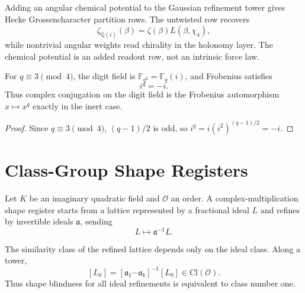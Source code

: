 \begin{principle}
\label{prin:innovation-input-modular-chirality-thermodynamics}
Adding an angular chemical potential to the Gaussian refinement tower gives
Hecke Grossencharacter partition rows. The untwisted row recovers
$$
\zeta_{\mathbb Q(i)}(\beta)=\zeta(\beta)L(\beta,\chi_4),
$$
while nontrivial angular weights read chirality in the holonomy layer. The
chemical potential is an added readout row, not an intrinsic force law.
\end{principle}

\begin{theorem}
\label{thm:innovation-input-modular-reflection-frobenius}
For $q\equiv 3\pmod{4}$, the digit field is
$\mathbb F_{q^2}=\mathbb F_q(i)$, and Frobenius satisfies
$$
i^q=-i.
$$
Thus complex conjugation on the digit field is the Frobenius automorphism
$x\mapsto x^q$ exactly in the inert case.
\end{theorem}

\begin{proof}
Since $q\equiv 3\pmod{4}$, $(q-1)/2$ is odd, so
$i^q=i(i^2)^{(q-1)/2}=-i$.
\end{proof}

\section{Class-Group Shape Registers}
\label{sec:innovation-input-modular-class-group-registers}

\begin{definition}
\label{def:innovation-input-modular-cm-shape-register}
Let $K$ be an imaginary quadratic field and $\mathcal O$ an order. A
complex-multiplication shape register starts from a lattice represented by
a fractional ideal $L$ and refines by invertible ideals
$\mathfrak a$, sending
$$
L\longmapsto\mathfrak a^{-1}L.
$$
\end{definition}

\begin{theorem}
\label{thm:innovation-input-modular-shape-class-walk}
The similarity class of the refined lattice depends only on the ideal
class. Along a tower,
$$
[L_k]=[\mathfrak a_1\cdots\mathfrak a_k]^{-1}[L_0]
\in\mathrm{Cl}(\mathcal O).
$$
Thus shape blindness for all ideal refinements is equivalent to class
number one.
\end{theorem}

